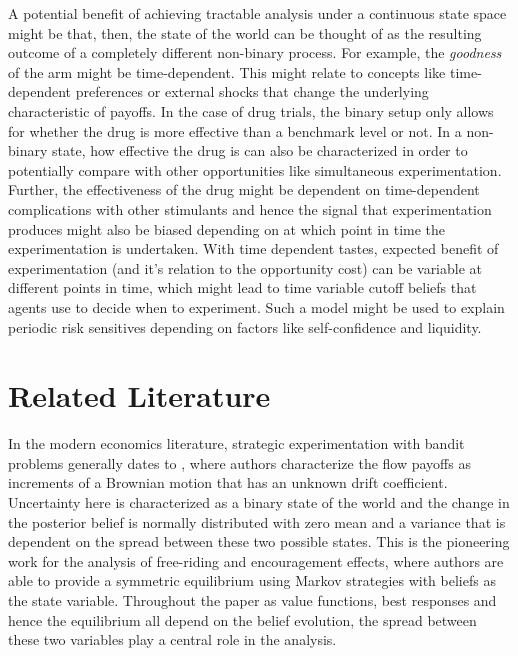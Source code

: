 A potential benefit of achieving tractable analysis under a continuous state space might be that, then, the state of the world can be thought of as the resulting outcome of a completely different non-binary process. For example, the \textit{goodness} of the arm might be time-dependent. This might relate to concepts like time-dependent preferences or external shocks that change the underlying characteristic of payoffs. In the case of drug trials, the binary setup only allows for whether the drug is more effective than a benchmark level or not. In a non-binary state, how effective the drug is can also be characterized in order to potentially compare with other opportunities like simultaneous experimentation. Further, the effectiveness of the drug might be dependent on time-dependent complications with other stimulants and hence the signal that experimentation produces might also be biased depending on at which point in time the experimentation is undertaken. With time dependent tastes, expected benefit of experimentation (and it's relation to the opportunity cost) can be variable at different points in time, which might lead to time variable cutoff beliefs that agents use to decide when to experiment. Such a model might be used to explain periodic risk sensitives depending on factors like self-confidence and liquidity.

\section*{Related Literature}

In the modern economics literature, strategic experimentation with bandit problems generally dates to \cite{bolton1999strategic}, where authors characterize the flow payoffs as increments of a Brownian motion that has an unknown drift coefficient. Uncertainty here is characterized as a binary state of the world and the change in the posterior belief is normally distributed with zero mean and a variance that is dependent on the spread between these two possible states. This is the pioneering work for the analysis of free-riding and encouragement effects, where authors are able to provide a symmetric equilibrium using Markov strategies with beliefs as the state variable. Throughout the paper as value functions, best responses and hence the equilibrium all depend on the belief evolution, the spread between these two variables play a central role in the analysis. 


